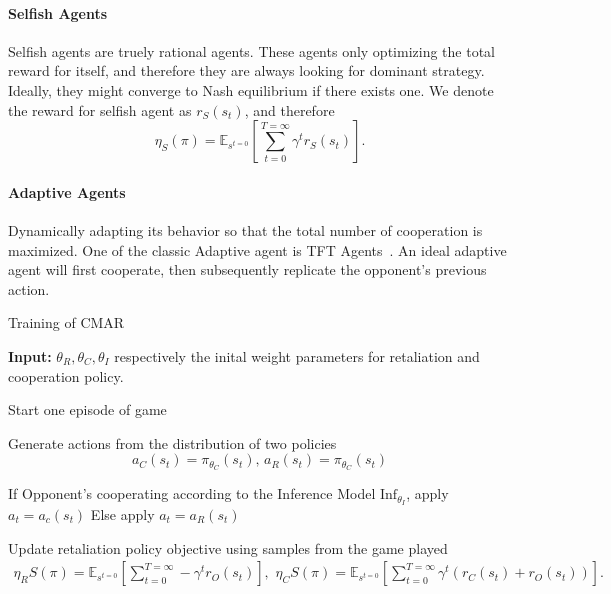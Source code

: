 \documentclass{article}
\begin{document}
\paragraph{Selfish Agents}
Selfish agents are truely rational agents.
These agents only optimizing the total reward for itself,
and therefore they are always looking for dominant strategy.
Ideally, they might converge to Nash equilibrium if there exists one.
We denote the reward for selfish agent as \(r_S(s_t)\), and therefore
\begin{equation}\label{equation:self_objective}
    \eta_S(\pi) =
    \mathbb{E}_{s^{t=0}}\left[\sum_{t=0}^{T=\infty}\gamma^t r_S(s_t)\right].
\end{equation}
\paragraph{Adaptive Agents}
Dynamically adapting its behavior so that the total number of cooperation is maximized.
One of the classic Adaptive agent is TFT Agents~\cite{nowak1993strategy}.
An ideal adaptive agent will first cooperate,
then subsequently replicate the opponent's previous action.
\begin{algorithm}[!t]
\caption{Training of CMAR}\label{algo}
\begin{algorithmic}[1]
\State \textbf{Input:}
    \(\theta_R, \theta_C, \theta_I\) respectively the inital weight parameters for retaliation and cooperation policy.

    \State Start one episode of game

        Generate actions from the distribution of two policies
        \begin{equation}
            a_C(s_t) = \pi_{\theta_C}(s_t), \, a_R(s_t) = \pi_{\theta_C}(s_t)
        \end{equation}

        \State If Opponent's cooperating according to the Inference Model \(\mbox{Inf}_{\theta_I}\), apply \(a_t = a_c(s_t)\)
        \State Else apply \(a_t = a_R(s_t)\)

    \EndWhile

    \State Update retaliation policy objective using samples from the game played
        \begin{equation}
            \begin{aligned}
                \eta_{R}S(\pi) = \mathbb{E}_{s^{t=0}}\left[\sum_{t=0}^{T=\infty}-\gamma^tr_O(s_t)\right],\,\,
                \eta_{C}S(\pi) = \mathbb{E}_{s^{t=0}}\left[\sum_{t=0}^{T=\infty}\gamma^t(r_C(s_t) + r_O(s_t))\right].
            \end{aligned}
        \end{equation}

\EndWhile\label{euclidendwhile}
\end{algorithmic}
\end{algorithm}
\end{document}
